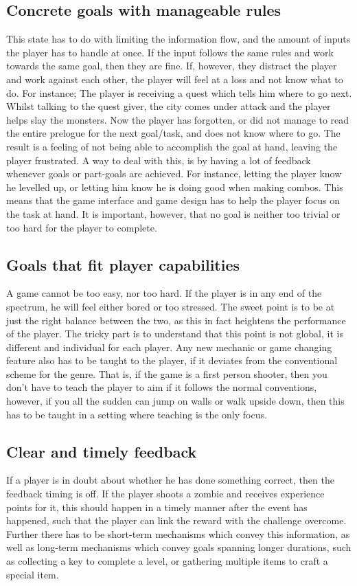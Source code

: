 \subsection{Concrete goals with manageable rules}
This state has to do with limiting the information flow, and the amount of inputs the player has to handle at once. If the input follows the same rules and work towards the same goal, then they are fine. If, however, they distract the player and work against each other, the player will feel at a loss and not know what to do. For instance; The player is receiving a quest which tells him where to go next. Whilst talking to the quest giver, the city comes under attack and the player helps slay the monsters. Now the player has forgotten, or did not manage to read the entire prelogue for the next goal/task, and does not know where to go. The result is a feeling of not being able to accomplish the goal at hand, leaving the player frustrated.
A way to deal with this, is by having a lot of feedback whenever goals or part-goals are achieved. For instance, letting the player know he levelled up, or letting him know he is doing good when making combos. This means that the game interface and game design has to help the player focus on the task at hand. It is important, however, that no goal is neither too trivial or too hard for the player to complete.

\subsection{Goals that fit player capabilities}
A game cannot be too easy, nor too hard. If the player is in any end of the spectrum, he will feel either bored or too stressed. The sweet point is to be at just the right balance between the two, as this in fact heightens the performance of the player. The tricky part is to understand that this point is not global, it is different and individual for each player. Any new mechanic or game changing feature also has to be taught to the player, if it deviates from the conventional scheme for the genre. That is, if the game is a first person shooter, then you don't have to teach the player to aim if it follows the normal conventions, however, if you all the sudden can jump on walls or walk upside down, then this has to be taught in a setting where teaching is the only focus.

\subsection{Clear and timely feedback}
If a player is in doubt about whether he has done something correct, then the feedback timing is off. If the player shoots a zombie and receives experience points for it, this should happen in a timely manner after the event has happened, such that the player can link the reward with the challenge overcome. Further there has to be short-term mechanisms which convey this information, as well as long-term mechanisms which convey goals spanning longer durations, such as collecting a key to complete a level, or gathering multiple items to craft a special item.

